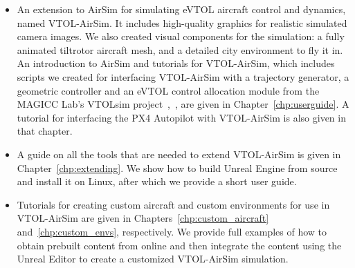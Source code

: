 \begin{itemize}
    \item An extension to AirSim for simulating eVTOL aircraft control and dynamics, named VTOL-AirSim. It includes high-quality graphics for realistic simulated camera images. We also created visual components for the simulation: a fully animated tiltrotor aircraft mesh, and a detailed city environment to fly it in. An introduction to AirSim and tutorials for VTOL-AirSim, which includes scripts we created for interfacing VTOL-AirSim with a trajectory generator, a geometric controller and an eVTOL control allocation module from the MAGICC Lab's VTOLsim project~\cite{Willis2021},~\cite{Willis2022}, are given in Chapter~\ref{chp:userguide}. A tutorial for interfacing the PX4 Autopilot with VTOL-AirSim is also given in that chapter.
    \item A guide on all the tools that are needed to extend VTOL-AirSim is given in Chapter~\ref{chp:extending}. We show how to build Unreal Engine from source and install it on Linux, after which we provide a short user guide.
    \item Tutorials for creating custom aircraft and custom environments for use in VTOL-AirSim are given in Chapters~\ref{chp:custom_aircraft} and~\ref{chp:custom_envs}, respectively. We provide full examples of how to obtain prebuilt content from online and then integrate the content using the Unreal Editor to create a customized VTOL-AirSim simulation.
\end{itemize}